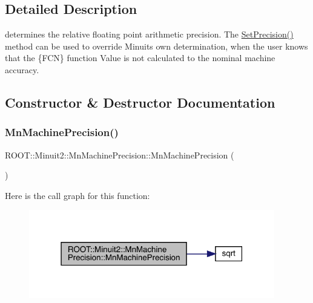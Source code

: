 \subsection{Detailed Description}
determines the relative floating point arithmetic precision. The \mbox{\hyperlink{classROOT_1_1Minuit2_1_1MnMachinePrecision_a625938e3c6362a06d09fc76e59f366b6}{Set\+Precision()}} method can be used to override Minuit\textquotesingle{}s own determination, when the user knows that the \{F\+CN\} function Value is not calculated to the nominal machine accuracy. 

\subsection{Constructor \& Destructor Documentation}
\mbox{\label{classROOT_1_1Minuit2_1_1MnMachinePrecision_aa40e069e8ca7ffc87ac53cdfebaf6316}} 
\subsubsection{\texorpdfstring{MnMachinePrecision()}{MnMachinePrecision()}\hspace{0.1cm}{\footnotesize\ttfamily [1/4]}}
{\footnotesize\ttfamily R\+O\+O\+T\+::\+Minuit2\+::\+Mn\+Machine\+Precision\+::\+Mn\+Machine\+Precision (\begin{DoxyParamCaption}{ }\end{DoxyParamCaption})}

Here is the call graph for this function\+:\nopagebreak
\begin{figure}[H]
\begin{center}
\leavevmode
\includegraphics[width=304pt]{d4/d40/classROOT_1_1Minuit2_1_1MnMachinePrecision_aa40e069e8ca7ffc87ac53cdfebaf6316_cgraph}
\end{center}
\end{figure}
\mbox{\label{classROOT_1_1Minuit2_1_1MnMachinePrecision_abcef7b80562b246252decc15b6fabc71}} 
